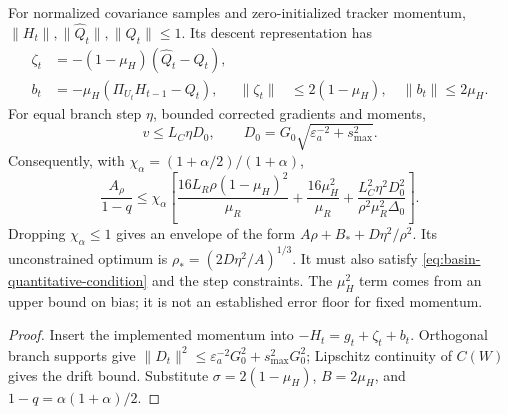 \begin{corollary}
For normalized covariance samples and zero-initialized tracker momentum,
$\|H_t\|,\|\widehat Q_t\|,\|Q_t\|\le1$. Its descent representation has
\begin{align}
 \zeta_t&=-(1-\mu_H)(\widehat Q_t-Q_t),\\
 b_t&=-\mu_H(\Pi_{U_t}H_{t-1}-Q_t),&
 \|\zeta_t\|&\le2(1-\mu_H),\quad\|b_t\|\le2\mu_H.
\end{align}
For equal branch step $\eta$, bounded corrected gradients and moments,
\begin{equation}
 v\le L_C\eta D_0,\qquad
 D_0=G_0\sqrt{\varepsilon_a^{-2}+s_{\max}^2}.
\end{equation}
Consequently, with $\chi_\alpha=(1+\alpha/2)/(1+\alpha)$,
\begin{equation}
 \frac{A_\rho}{1-q}
 \le\chi_\alpha\left[
       \frac{16L_R\rho(1-\mu_H)^2}{\mu_R}
       +\frac{16\mu_H^2}{\mu_R}
       +\frac{L_C^2\eta^2D_0^2}{\rho^2\mu_R^2\Delta_0}\right].
 \label{eq:implemented-basin-budget}
\end{equation}
Dropping $\chi_\alpha\le1$ gives an envelope of the form
$A\rho+B_*+D\eta^2/\rho^2$. Its unconstrained optimum is
$\rho_*=(2D\eta^2/A)^{1/3}$. It must also satisfy
\eqref{eq:basin-quantitative-condition} and the step constraints. The
$\mu_H^2$ term comes from an upper bound on bias; it is not an established
error floor for fixed momentum.
\end{corollary}
\begin{proof}
Insert the implemented momentum into $-H_t=g_t+\zeta_t+b_t$.
Orthogonal branch supports give
$\|D_t\|^2\le\varepsilon_a^{-2}G_0^2+s_{\max}^2G_0^2$;
Lipschitz continuity of $C(W)$ gives the drift bound. Substitute
$\sigma=2(1-\mu_H)$, $B=2\mu_H$, and
$1-q=\alpha(1+\alpha)/2$.
\end{proof}
